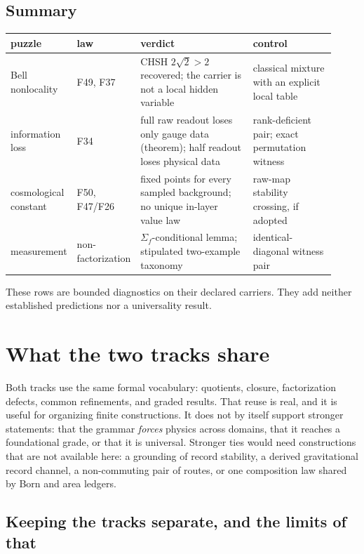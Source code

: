 \documentclass[11pt]{article}
\theoremstyle{definition}
\begin{document}
\subsection{Summary}\label{the-pattern}

\begin{center}
\small
\begin{longtable}[]{@{}p{0.17\linewidth}p{0.13\linewidth}p{0.36\linewidth}p{0.26\linewidth}@{}}
\toprule
puzzle & law & verdict & control\\
\midrule
\endhead
Bell nonlocality & F49, F37 & CHSH \(2\sqrt2>2\) recovered; the carrier is not a local hidden variable & classical
mixture with an explicit local table\\
information loss & F34 & full raw readout loses only gauge data (theorem); half readout loses physical data &
rank-deficient pair; exact permutation witness\\
cosmological constant & F50, F47/F26 & fixed points for every sampled background; no unique in-layer value law &
raw-map stability crossing, if adopted\\
measurement & non-factorization & \(\Sigma_f\)-conditional lemma; stipulated two-example taxonomy & identical-diagonal
witness pair\\
\bottomrule
\end{longtable}
\end{center}

These rows are bounded diagnostics on their declared carriers. They add neither established predictions nor a
universality result.
 \section{What the two tracks share}\label{cross-track-ties-and-the-one-grammar-thesis}

Both tracks use the same formal vocabulary: quotients, closure, factorization defects, common refinements, and graded
results. That reuse is real, and it is useful for organizing finite constructions. It does not by itself support
stronger statements: that the grammar \emph{forces} physics across domains, that it reaches a foundational grade, or
that it is universal. Stronger ties would need constructions that are not available here: a grounding of record
stability, a derived gravitational record channel, a non-commuting pair of routes, or one composition law shared by
Born and area ledgers.

\subsection{Keeping the tracks separate, and the limits of that}\label{why-the-ties-are-non-trivial-the-anti-contamination-guard}
\end{document}
